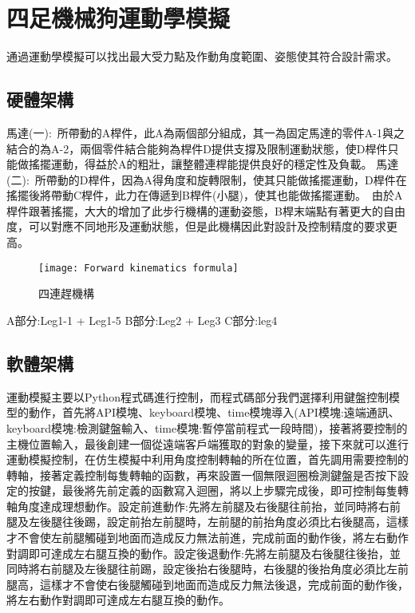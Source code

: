 \chapter{四足機械狗運動學模擬}

通過運動學模擬可以找出最大受力點及作動角度範圍、姿態使其符合設計需求。\\

\section{硬體架構}

馬達(一):\
所帶動的A桿件，此A為兩個部分組成，其一為固定馬達的零件A-1與之結合的為A-2，兩個零件結合能夠為桿件D提供支撐及限制運動狀態，使D桿件只能做搖擺運動，得益於A的粗壯，讓整體連桿能提供良好的穩定性及負載。
馬達(二):\
所帶動的D桿件，因為A得角度和旋轉限制，使其只能做搖擺運動，D桿件在搖擺後將帶動C桿件，此力在傳遞到B桿件(小腿)，使其也能做搖擺運動。\
由於A桿件跟著搖擺，大大的增加了此步行機構的運動姿態，B桿末端點有著更大的自由度，可以對應不同地形及運動狀態，但是此機構因此對設計及控制精度的要求更高。\\

\begin{figure}[hbt!]
\begin{center}
\texttt{[image: Forward kinematics formula]}
\caption{\Large 四連趕機構}\label{Forward kinematics formula}
\end{center}
\end{figure}

A部分:Leg1-1 + Leg1-5
B部分:Leg2 + Leg3
C部分:leg4

\section{軟體架構}
運動模擬主要以Python程式碼進行控制，而程式碼部分我們選擇利用鍵盤控制模型的動作，首先將API模塊、keyboard模塊、time模塊導入(API模塊:遠端通訊、keyboard模塊:檢測鍵盤輸入、time模塊:暫停當前程式一段時間)，接著將要控制的主機位置輸入，最後創建一個從遠端客戶端獲取的對象的變量，接下來就可以進行運動模擬控制，在仿生模擬中利用角度控制轉軸的所在位置，首先調用需要控制的轉軸，接著定義控制每隻轉軸的函數，再來設置一個無限迴圈檢測鍵盤是否按下設定的按鍵，最後將先前定義的函數寫入迴圈，將以上步驟完成後，即可控制每隻轉軸角度達成理想動作。設定前進動作:先將左前腿及右後腿往前抬，並同時將右前腿及左後腿往後踢，設定前抬左前腿時，左前腿的前抬角度必須比右後腿高，這樣才不會使左前腿觸碰到地面而造成反力無法前進，完成前面的動作後，將左右動作對調即可達成左右腿互換的動作。設定後退動作:先將左前腿及右後腿往後抬，並同時將右前腿及左後腿往前踢，設定後抬右後腿時，右後腿的後抬角度必須比左前腿高，這樣才不會使右後腿觸碰到地面而造成反力無法後退，完成前面的動作後，將左右動作對調即可達成左右腿互換的動作。\\
\newpage

